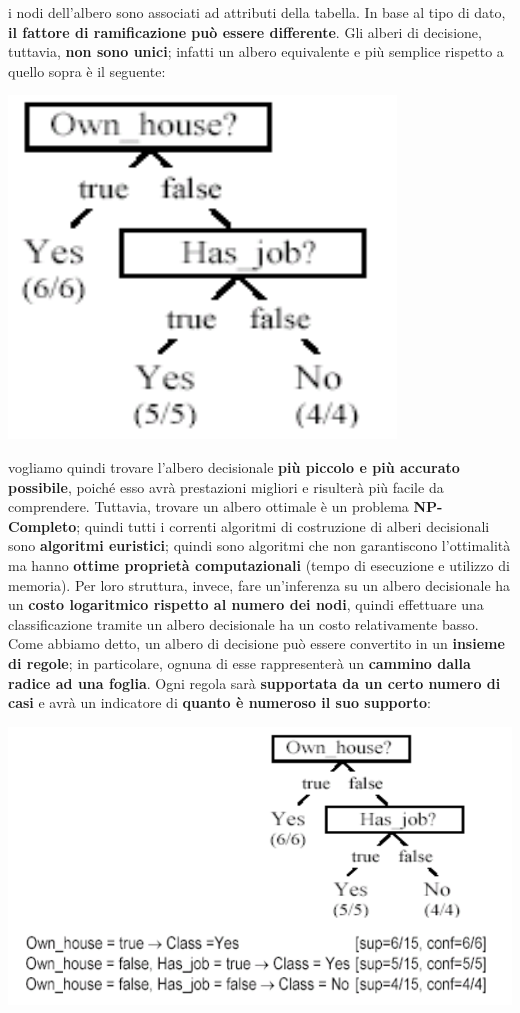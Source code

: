 \documentclass[12pt]{article}
\begin{document}
i nodi dell'albero sono associati ad attributi della tabella. In base al tipo di dato, \textbf{il fattore di ramificazione può essere differente}.
Gli alberi di decisione, tuttavia, \textbf{non sono unici}; infatti un albero equivalente e più semplice rispetto a quello sopra è il seguente:
\begin{center}
    \includegraphics[width =0.40\linewidth]{Images/71.PNG}
\end{center}
vogliamo quindi trovare l'albero decisionale \textbf{più piccolo e più accurato possibile}, poiché esso avrà prestazioni migliori e risulterà più facile da comprendere.
Tuttavia, trovare un albero ottimale è un problema \textbf{NP-Completo}; quindi tutti i correnti algoritmi di costruzione di alberi decisionali sono \textbf{algoritmi euristici}; quindi sono algoritmi che non garantiscono l'ottimalità
ma hanno \textbf{ottime proprietà computazionali} (tempo di esecuzione e utilizzo di memoria). Per loro struttura, invece, fare un'inferenza su un albero decisionale ha un \textbf{costo logaritmico rispetto al numero dei nodi}, quindi effettuare una classificazione
tramite un albero decisionale ha un costo relativamente basso.
Come abbiamo detto, un albero di decisione può essere convertito in un \textbf{insieme di regole}; in particolare, ognuna di esse rappresenterà un \textbf{cammino dalla radice ad una foglia}.
Ogni regola sarà \textbf{supportata da un certo numero di casi} e avrà un indicatore di \textbf{quanto è numeroso il suo supporto}:
\begin{center}
    \includegraphics[width =0.90\linewidth]{Images/72.PNG}
\end{center}
\end{document}
